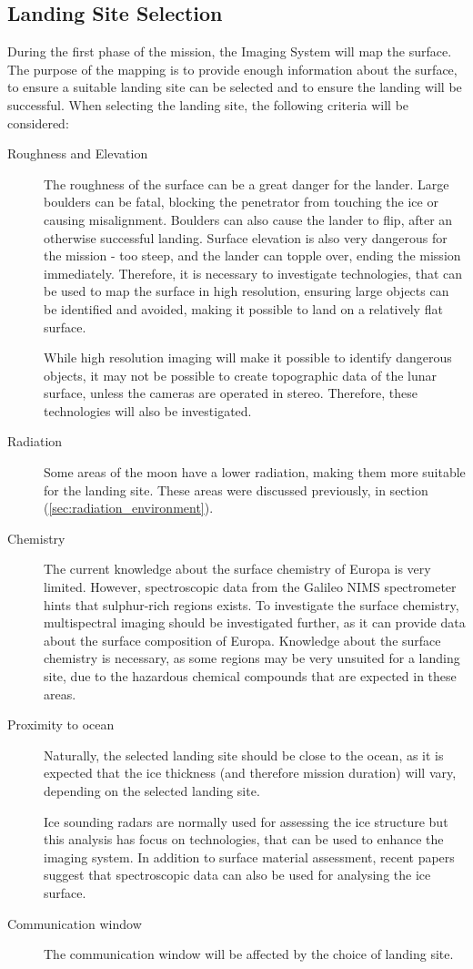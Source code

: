 \subsection{Landing Site Selection}
During the first phase of the mission, the Imaging System will map the surface. The purpose of the mapping is to provide enough information about the surface, to ensure a suitable landing site can be selected and to ensure the landing will be successful. When selecting the landing site, the following criteria will be considered:
\begin{description}
    \item[Roughness and Elevation] The roughness of the surface can be a great danger for the lander. Large boulders can be fatal, blocking the penetrator from touching the ice or causing misalignment. Boulders can also cause the lander to flip, after an otherwise successful landing. Surface elevation is also very dangerous for the mission - too steep, and the lander can topple over, ending the mission immediately. Therefore, it is necessary to investigate technologies, that can be used to map the surface in high resolution, ensuring large objects can be identified and avoided, making it possible to land on a relatively flat surface.
    
    While high resolution imaging will make it possible to identify dangerous objects, it may not be possible to create topographic data of the lunar surface, unless the cameras are operated in stereo. Therefore, these technologies will also be investigated.
    \item[Radiation] Some areas of the moon have a lower radiation, making them more suitable for the landing site. These areas were discussed previously, in section (\ref{sec:radiation_environment}).
    \item[Chemistry] The current knowledge about the surface chemistry of Europa is very limited. However, spectroscopic data from the Galileo NIMS spectrometer hints that sulphur-rich regions exists. To investigate the surface chemistry, multispectral imaging should be investigated further, as it can provide data about the surface composition of Europa. Knowledge about the surface chemistry is necessary, as some regions may be very unsuited for a landing site, due to the hazardous chemical compounds that are expected in these areas.
    \item[Proximity to ocean] Naturally, the selected landing site should be close to the ocean, as it is expected that the ice thickness (and therefore mission duration) will vary, depending on the selected landing site.
    
    Ice sounding radars are normally used for assessing the ice structure but this analysis has focus on technologies, that can be used to enhance the imaging system. In addition to surface material assessment, recent papers suggest that spectroscopic data can also be used for analysing the ice surface\cite{naegeli2015a}.
    \item[Communication window] The communication window will be affected by the choice of landing site.
\end{description}
